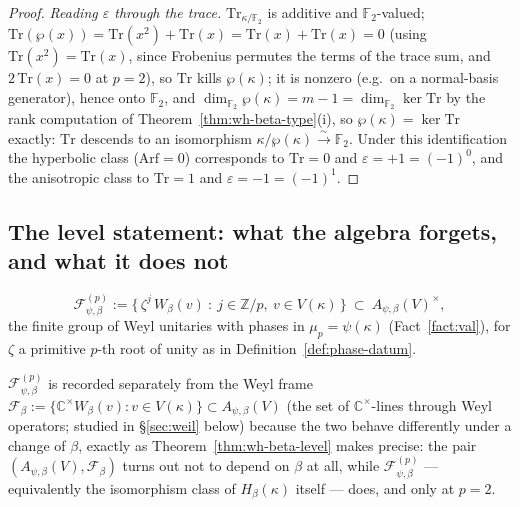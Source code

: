 \begin{proof}
\emph{Reading $\varepsilon$ through the trace.} $\mathrm{Tr}_{\kappa/\mathbb{F}_2}$
is additive and $\mathbb{F}_2$-valued; $\mathrm{Tr}(\wp(x))=\mathrm{Tr}(x^2)+\mathrm{Tr}(x)=\mathrm{Tr}(x)+\mathrm{Tr}(x)=0$
(using $\mathrm{Tr}(x^2)=\mathrm{Tr}(x)$, since Frobenius permutes the terms
of the trace sum, and $2\,\mathrm{Tr}(x)=0$ at $p=2$), so
$\mathrm{Tr}$ kills $\wp(\kappa)$; it is nonzero (e.g.\ on a normal-basis
generator), hence onto $\mathbb{F}_2$, and $\dim_{\mathbb{F}_2}\wp(\kappa)=m-1=\dim_{\mathbb{F}_2}\ker\mathrm{Tr}$
by the rank computation of Theorem~\ref{thm:wh-beta-type}(i), so
$\wp(\kappa)=\ker\mathrm{Tr}$ exactly: $\mathrm{Tr}$ descends to an
isomorphism $\kappa/\wp(\kappa)\xrightarrow{\sim}\mathbb{F}_2$. Under this
identification the hyperbolic class ($\mathrm{Arf}=0$) corresponds to
$\mathrm{Tr}=0$ and $\varepsilon=+1=(-1)^0$, and the anisotropic class to
$\mathrm{Tr}=1$ and $\varepsilon=-1=(-1)^1$.
\end{proof}

\subsection{The level statement: what the algebra forgets, and what it does not}

\begin{definition}
\label{def:level-frame}
\[
\mathcal{F}^{(p)}_{\psi,\beta} := \big\{\, \zeta^j\, W_\beta(v) \ :\ j\in\mathbb{Z}/p,\ v\in V(\kappa) \,\big\}
\ \subset\ A_{\psi,\beta}(V)^\times,
\]
the finite group of Weyl unitaries with phases in $\mu_p=\psi(\kappa)$
(Fact~\ref{fact:val}), for $\zeta$ a primitive $p$-th root of unity as in
Definition~\ref{def:phase-datum}.
\end{definition}

\begin{scope}
$\mathcal{F}^{(p)}_{\psi,\beta}$ is recorded separately from the Weyl frame
$\mathcal{F}_\beta := \{\mathbb{C}^\times W_\beta(v) : v\in V(\kappa)\}\subset A_{\psi,\beta}(V)$
(the set of $\mathbb{C}^\times$-lines through Weyl operators; studied in
\S\ref{sec:weil} below) because the two behave differently under a change of
$\beta$, exactly as Theorem~\ref{thm:wh-beta-level} makes precise: the pair
$(A_{\psi,\beta}(V),\mathcal{F}_\beta)$ turns out not to depend on $\beta$ at
all, while $\mathcal{F}^{(p)}_{\psi,\beta}$ — equivalently the isomorphism
class of $H_\beta(\kappa)$ itself — does, and only at $p=2$.
\end{scope}

